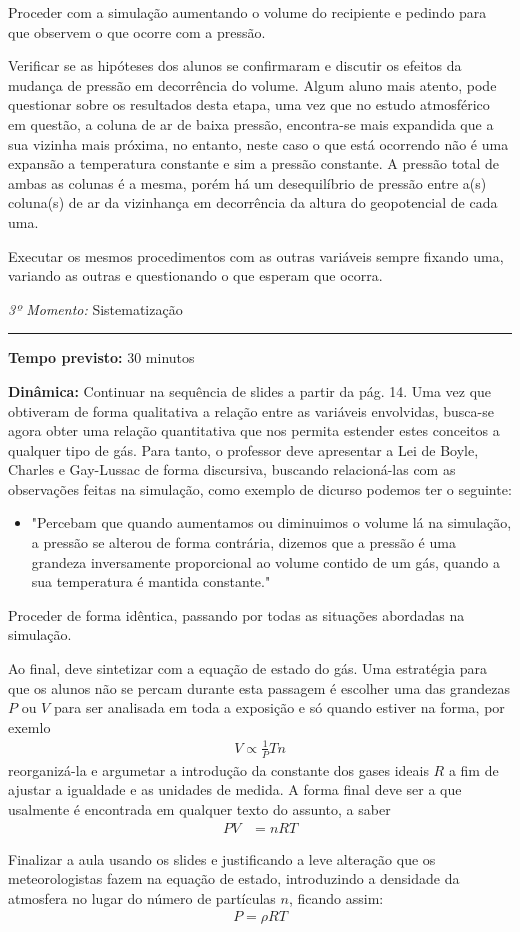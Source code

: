 Proceder com a simulação aumentando o volume do recipiente e pedindo para que observem o que ocorre com a pressão.

Verificar se as hipóteses dos alunos se confirmaram e discutir os efeitos da mudança de pressão em decorrência do volume. Algum aluno mais atento, pode questionar sobre os resultados desta etapa, uma vez que no estudo atmosférico em questão, a coluna de ar de baixa pressão, encontra-se mais expandida que a sua vizinha mais próxima, no entanto, neste caso o que está ocorrendo não é uma expansão a temperatura constante e sim a pressão constante. A pressão total de ambas as colunas é a mesma, porém há um desequilíbrio de pressão entre a(s) coluna(s) de ar da vizinhança em decorrência da altura do geopotencial de cada uma.

Executar os mesmos procedimentos com as outras variáveis sempre fixando uma, variando as outras e questionando o que esperam que ocorra.
\vspace{50pt}
\par\noindent\emph{3º Momento:} Sistematização
\par\noindent\rule{.3\textwidth}{.5pt}
\par\noindent\textbf{Tempo previsto:} 30 minutos

\par\noindent\textbf{Dinâmica:} Continuar na sequência de slides a partir da pág. 14. Uma vez que obtiveram de forma qualitativa a relação entre as variáveis envolvidas, busca-se agora obter uma relação quantitativa que nos permita estender estes conceitos a qualquer tipo de gás. Para tanto, o professor deve apresentar a Lei de Boyle, Charles e Gay-Lussac de forma discursiva, buscando relacioná-las com as observações feitas na simulação, como exemplo de dicurso podemos ter o seguinte:

\begin{itemize}
		\item "Percebam que quando aumentamos ou diminuimos o volume lá na simulação, a pressão se alterou de forma contrária, dizemos que a pressão é uma grandeza inversamente proporcional ao volume contido de um gás, quando a sua temperatura é mantida constante."
\end{itemize}

Proceder de forma idêntica, passando por todas as situações abordadas na simulação.

Ao final, deve sintetizar com a equação de estado do gás. Uma estratégia para que os alunos não se percam durante esta passagem é escolher uma das grandezas $P$ ou $V$ para ser analisada em toda a exposição e só quando estiver na forma, por exemlo
\begin{align}
		V\propto \frac{1}{P}Tn
\end{align}
reorganizá-la e argumetar a introdução da constante dos gases ideais $R$ a fim de ajustar a igualdade e as unidades de medida. A forma final deve ser a que usalmente é encontrada em qualquer texto do assunto, a saber
\begin{align}
	PV&=nRT
\end{align}

Finalizar a aula usando os slides e justificando a leve alteração que os meteorologistas fazem na equação de estado, introduzindo a densidade da atmosfera no lugar do número de partículas $n$, ficando assim:
\begin{align}
		P = \rho RT
\end{align}

